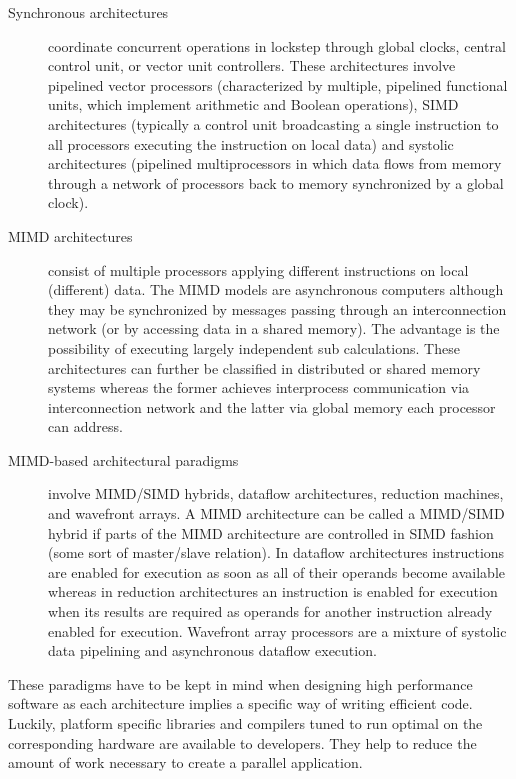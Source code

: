 \begin{description}
\item[Synchronous architectures] coordinate concurrent operations in
  lockstep through global clocks, central control unit, or vector unit
  controllers. These architectures involve pipelined vector processors
  (characterized by multiple, pipelined functional units, which
  implement arithmetic and Boolean operations), SIMD architectures
  (typically a control unit broadcasting a single instruction to
  all processors executing the instruction on local data) and systolic
  architectures (pipelined multiprocessors in which data flows from
  memory through a network of processors back to memory synchronized
  by a global clock). 
\item[MIMD architectures] consist of multiple processors applying
  different instructions on local (different) data. The MIMD models
  are asynchronous computers although they may be synchronized by
  messages passing through an interconnection network (or by accessing
  data in a shared memory). The advantage is the possibility of
  executing largely independent sub calculations. These architectures
  can further be classified in distributed or shared memory systems
  whereas the former achieves interprocess communication via 
  interconnection network and the latter via global memory each
  processor can address.
\item[MIMD-based architectural paradigms] involve MIMD/SIMD hybrids,
  dataflow architectures, reduction machines, and wavefront arrays. A
  MIMD architecture can be called a MIMD/SIMD hybrid if parts of the
  MIMD architecture are controlled in SIMD fashion (some sort of
  master/slave relation). In dataflow architectures instructions are
  enabled for execution as soon as all of their operands become
  available whereas in reduction architectures an instruction is
  enabled for execution when its results are required as operands for
  another instruction already enabled for execution. Wavefront array
  processors are a mixture of systolic data pipelining and asynchronous
  dataflow execution.
\end{description}

These paradigms have to be kept in mind when designing high performance
software as each architecture implies a specific way of writing
efficient code. Luckily, platform specific libraries and compilers
tuned to run optimal on the corresponding hardware are available to
developers. They help to reduce the amount of work necessary to
create a parallel application.

